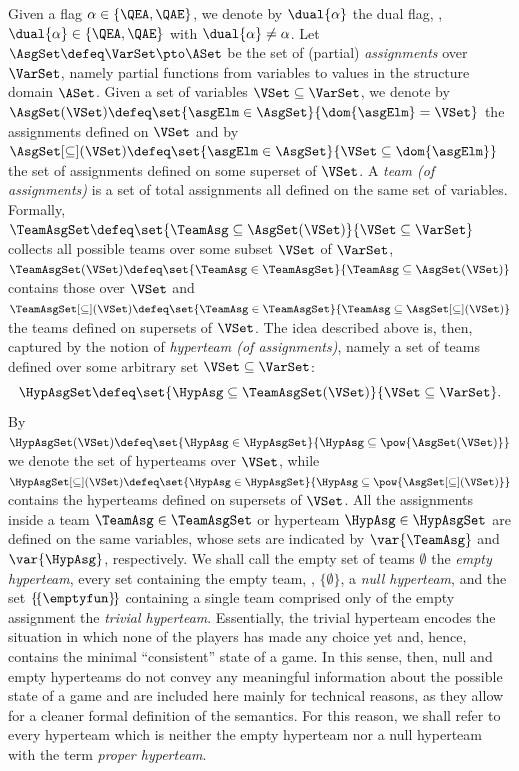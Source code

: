 \documentclass[authoryear]{elsarticle}
\newcommand{\EmpHypAsg}{\emptyset}
\newcommand{\NulHypAsg}{\{\emptyset\}}
\newcommand{\TrvHypAsg}{\{\!\{\emptyfun\}\!\}}
\begin{document}
Given a flag $\alpha \in \{ \QEA, \QAE \}$, we denote by $\dual{\alpha}$ the
dual flag, \ie, $\dual{\alpha} \in \allowbreak \{ \QEA, \QAE \}$ with
$\dual{\alpha} \neq \alpha$.
Let $\AsgSet \defeq \VarSet \pto \ASet$ be the set of (partial)
\emph{assignments} over $\VarSet$, namely partial functions from variables to
values in the structure domain $\ASet$.
Given a set of variables $\VSet \subseteq \VarSet$, we denote by $\AsgSet(\VSet)
\defeq \set{ \asgElm \in \AsgSet }{ \dom{\asgElm} = \VSet }$ the assignments
defined on $\VSet$ and by $\AsgSet[\subseteq](\VSet) \defeq \set{ \asgElm \in
\AsgSet }{ \VSet \subseteq \dom{\asgElm} }$ the set of assignments defined on
some superset of $\VSet$.
%
A \emph{team (of assignments)} is a set of total assignments all defined on the
same set of variables.
Formally, $\TeamAsgSet \defeq \set{ \TeamAsg \subseteq \AsgSet(\VSet) }{ \VSet
\subseteq \VarSet }$ collects all possible teams over some subset $\VSet$ of
$\VarSet$, $\TeamAsgSet(\VSet) \defeq \set{ \TeamAsg \in \TeamAsgSet }{ \TeamAsg
\subseteq \AsgSet(\VSet) }$ contains those over $\VSet$ and
$\TeamAsgSet[\subseteq](\VSet) \defeq \set{ \TeamAsg \in \TeamAsgSet }{ \TeamAsg
\subseteq \AsgSet[\subseteq](\VSet) }$ the teams defined on supersets of
$\VSet$.
%
The idea described above is, then, captured by the notion of \emph{hyperteam (of
assignments)}, namely a set of teams defined over some arbitrary set $\VSet
\subseteq \VarSet$:
\[
  \HypAsgSet \defeq \set{ \HypAsg \subseteq \TeamAsgSet(\VSet) }{ \VSet
  \subseteq \VarSet }.
\]
By $\HypAsgSet(\VSet) \defeq \set{ \HypAsg \in \HypAsgSet }{ \HypAsg \subseteq
\pow{\AsgSet(\VSet)} }$ we denote the set of hyperteams over $\VSet$, while
$\HypAsgSet[\subseteq](\VSet) \defeq \set{ \HypAsg \in \HypAsgSet }{ \HypAsg
\subseteq \pow{\AsgSet[\subseteq](\VSet)} }$ contains the hyperteams defined on
supersets of $\VSet$.
%
All the assignments inside a team $\TeamAsg \in \TeamAsgSet$ or hyperteam
$\HypAsg \in \HypAsgSet$ are defined on the same variables, whose sets are
indicated by $\var{\TeamAsg}$ and $\var{\HypAsg}$, respectively.
%
We shall call the empty set of teams $\EmpHypAsg$ the \emph{empty hyperteam},
every set containing the empty team, \eg, $\NulHypAsg$, a \emph{null hyperteam},
and the set $\TrvHypAsg$ containing a single team comprised only of the empty
assignment the \emph{trivial hyperteam}.
Essentially, the trivial hyperteam encodes the situation in which none of the
players has made any choice yet and, hence, contains the minimal ``consistent''
state of a game.
In this sense, then, null and empty hyperteams do not convey any meaningful
information about the possible state of a game and are included here mainly for
technical reasons, as they allow for a cleaner formal definition of the
semantics.
For this reason, we shall refer to every hyperteam which is neither the empty
hyperteam nor a null hyperteam with the term \emph{proper hyperteam}.
\end{document}
